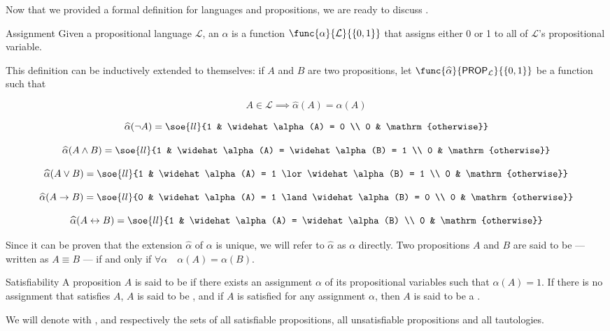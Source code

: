 \documentclass[a4paper, 12pt]{report}
\begin{document}
    Now that we provided a formal definition for languages and propositions, we are ready to discuss .

    \begin{frameddefn}{Assignment}
        Given a propositional language $\mathcal L$, an  $\alpha$ is a function $\func{\alpha}{\mathcal L}{\{0, 1\}}$ that assigns either 0 or 1 to all of $\mathcal L$'s propositional variable.
    \end{frameddefn}

    This definition can be inductively extended to  themselves: if $A$ and $B$ are two propositions, let $\func{\widehat \alpha}{\textsf{PROP}_{\mathcal L}}{\{0, 1\}}$ be a function such that

    $$A \in \mathcal L \implies \widehat \alpha (A) = \alpha(A)$$
    
    $$\widehat \alpha(\lnot A) = \soe{ll}{1 & \widehat \alpha(A) = 0 \\ 0 & \mathrm{otherwise}}$$

    $$\widehat \alpha(A \land B) = \soe{ll}{1 & \widehat \alpha(A) = \widehat \alpha(B) = 1 \\ 0 & \mathrm{otherwise}}$$

    $$\widehat \alpha(A \lor B) = \soe{ll}{1 & \widehat \alpha(A) = 1 \lor \widehat \alpha(B) = 1 \\ 0 & \mathrm{otherwise}}$$

    $$\widehat \alpha(A \rightarrow B) = \soe{ll}{0 & \widehat \alpha(A) = 1 \land \widehat \alpha(B) = 0 \\ 0 & \mathrm{otherwise}}$$

    $$\widehat \alpha(A \leftrightarrow B) = \soe{ll}{1 & \widehat \alpha(A) = \widehat \alpha (B) \\ 0 & \mathrm{otherwise}}$$

    Since it can be proven that the extension $\widehat \alpha$ of $\alpha$ is unique, we will refer to $\widehat \alpha$ as $\alpha$ directly. Two propositions $A$ and $B$ are said to be  --- written as $A \equiv B$ --- if and only if $\forall \alpha \quad \alpha(A) = \alpha(B)$.

    \begin{frameddefn}{Satisfiability}
        A proposition $A$ is said to be  if there exists an assignment $\alpha$ of its propositional variables such that $\alpha(A) = 1$. If there is no assignment that satisfies $A$, $A$ is said to be , and if $A$ is satisfied for any assignment $\alpha$, then $A$ is said to be a .

        We will denote with \SAT, \UNSAT and \TAUT respectively the sets of all satisfiable propositions, all unsatisfiable propositions and all tautologies.
    \end{frameddefn}
\end{document}
